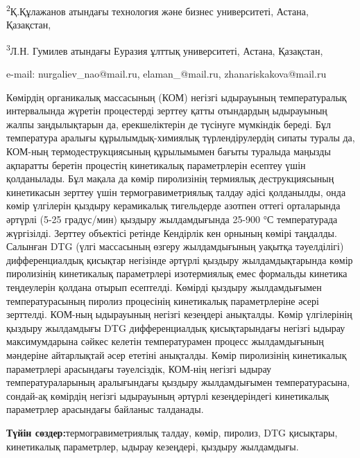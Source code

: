 \textsuperscript{2}Қ.Құлажанов атындағы технология және бизнес
университеті, Астана, Қазақстан,

\textsuperscript{3}Л.Н. Гумилев атындағы Еуразия ұлттық университеті,
Астана, Қазақстан,

e-mail: nurgaliev\_nao@mail.ru, elaman\_@mail.ru, zhanariskakova@mail.ru

Көмірдің органикалық массасының (КОМ) негізгі ыдырауының температуралық
интервалында жүретін процестерді зерттеу қатты отындардың ыдырауының
жалпы заңдылықтарын да, ерекшеліктерін де түсінуге мүмкіндік береді. Бұл
температура аралығы құрылымдық-химиялық түрлендірулердің сипаты туралы
да, КОМ-ның термодеструкциясының құрылымымен бағыты туралыда маңызды
ақпаратты беретін процестің кинетикалық параметрлерін есептеу үшін
қолданылады. Бұл мақала да көмір пиролизінің термиялық деструкциясының
кинетикасын зерттеу үшін термогравиметриялық талдау әдісі қолданылды,
онда көмір үлгілерін қыздыру керамикалық тигельдерде азотпен оттегі
орталарында әртүрлі (5-25 градус/мин) қыздыру жылдамдығында 25-900 °С
температурада жүргізілді. Зерттеу объектісі ретінде Кендірлік кен
орнының көмірі таңдалды. Салынған DTG (үлгі массасының өзгеру
жылдамдығының уақытқа тәуелділігі) дифференциалдық қисықтар негізінде
әртүрлі қыздыру жылдамдықтарында көмір пиролизінің кинетикалық
параметрлері изотермиялық емес формальды кинетика теңдеулерін қолдана
отырып есептелді. Көмірді қыздыру жылдамдығымен температурасының пиролиз
процесінің кинетикалық параметрлеріне әсері зерттелді. КОМ-ның
ыдырауының негізгі кезеңдері анықталды. Көмір үлгілерінің қыздыру
жылдамдығы DTG дифференциалдық қисықтарындағы негізгі ыдырау
максимумдарына сәйкес келетін температурамен процесс жылдамдығының
мәндеріне айтарлықтай әсер ететіні анықталды. Көмір пиролизінің
кинетикалық параметрлері арасындағы тәуелсіздік, КОМ-нің негізгі ыдырау
температураларының аралығындағы қыздыру жылдамдығымен температурасына,
сондай-ақ көмірдің негізгі ыдырауының әртүрлі кезеңдеріндегі кинетикалық
параметрлер арасындағы байланыс талданады.

\textbf{Түйін сөздер:}термогравиметриялық талдау, көмір, пиролиз, DTG
қисықтары, кинетикалық параметрлер, ыдырау кезеңдері, қыздыру
жылдамдығы.

